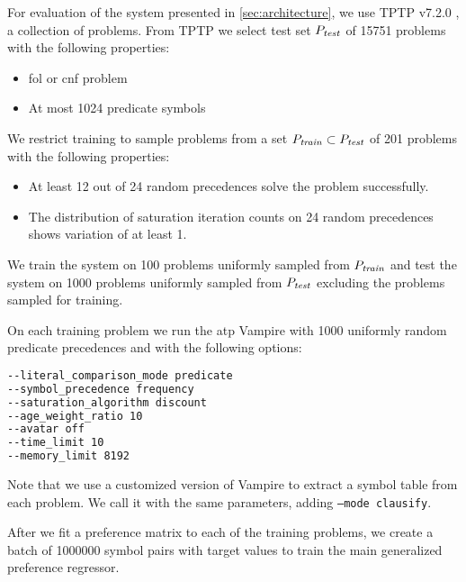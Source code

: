 For evaluation of the system presented in \autoref{sec:architecture},
we use TPTP v7.2.0 \cite{?}, a collection of problems.
From TPTP we select test set \(P_{\mathit{test}}\) of 15751 problems with the following properties:

\begin{itemize}
	\item \gls{fol} or \gls{cnf} problem
	\item At most 1024 predicate symbols
\end{itemize}

We restrict training to sample problems from a set
\(P_{\mathit{train}} \subset P_{\mathit{test}}\) of 201 problems
with the following properties:

\begin{itemize}
	\item At least 12 out of 24 random precedences solve the problem successfully.
	\item The distribution of saturation iteration counts on 24 random precedences
	shows variation of at least 1.
\end{itemize}

We train the system on 100 problems uniformly sampled from \(P_{\mathit{train}}\)
and test the system on 1000 problems uniformly sampled from \(P_{\mathit{test}}\)
excluding the problems sampled for training.

On each training problem we run the \gls{atp} Vampire with 1000 uniformly random predicate precedences
and with the following options:

\begin{lstlisting}[language=sh]
--literal_comparison_mode predicate
--symbol_precedence frequency
--saturation_algorithm discount
--age_weight_ratio 10
--avatar off
--time_limit 10
--memory_limit 8192
\end{lstlisting}

Note that we use a customized version of Vampire to extract a symbol table from each problem.
We call it with the same parameters, adding \texttt{--mode clausify}.

After we fit a preference matrix to each of the training problems,
we create a batch of 1000000 symbol pairs with target values
to train the main generalized preference regressor.


